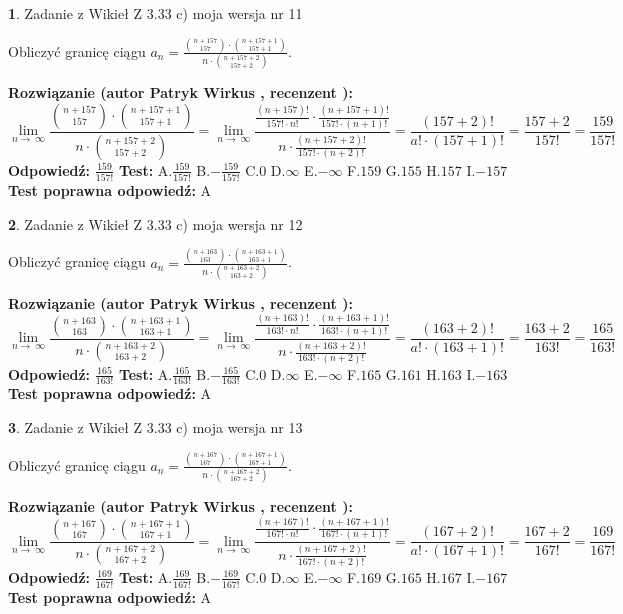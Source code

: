 \documentclass[12pt, a4paper]{article}
\theoremstyle{definition} %
\newtheorem{zad}{}
\newcommand{\zadStart}[1]{\begin{zad}#1\newline}
\newcommand{\zadStop}{\end{zad}}
\newcommand{\rozwStart}[2]{\noindent \textbf{Rozwiązanie (autor #1 , recenzent #2): }\newline}
\newcommand{\rozwStop}{\newline}
\newcommand{\odpStart}{\noindent \textbf{Odpowiedź:}\newline}
\newcommand{\odpStop}{\newline}
\newcommand{\testStart}{\noindent \textbf{Test:}\newline}
\newcommand{\testStop}{\newline}
\newcommand{\kluczStart}{\noindent \textbf{Test poprawna odpowiedź:}\newline}
\newcommand{\kluczStop}{\newline}
\begin{document}
\zadStart{Zadanie z Wikieł Z 3.33 c) moja wersja nr 11}

Obliczyć granicę ciągu $a_{n}=\frac{{n+157\choose157}\cdot{n+157+1\choose157+1}}{n\cdot{n+157+2\choose157+2}}$.
\zadStop
\rozwStart{Patryk Wirkus}{}
$$\lim\limits_{n\to\ \infty}\frac{{n+157\choose157}\cdot{n+157+1\choose157+1}}{n\cdot{n+157+2\choose157+2}} = \lim\limits_{n\to\ \infty}\frac{\frac{(n+157)!}{157! \cdot n!}\cdot \frac{(n+157+1)!}{157! \cdot (n+1)!}}{n\cdot \frac{(n+157+2)!}{157! \cdot (n+2)!}} = \frac{(157+2)!}{a!\cdot (157+1)!} = \frac{157+2}{157!} = \frac{159}{157!}$$
\rozwStop
\odpStart
$\frac{159}{157!}$
\odpStop
\testStart
A.$\frac{159}{157!}$ B.$-\frac{159}{157!}$ C.$0$ D.$\infty$ E.$-\infty$
F.$159$ G.$155$
H.$157$
I.$-157$
\testStop
\kluczStart
A
\kluczStop



\zadStart{Zadanie z Wikieł Z 3.33 c) moja wersja nr 12}

Obliczyć granicę ciągu $a_{n}=\frac{{n+163\choose163}\cdot{n+163+1\choose163+1}}{n\cdot{n+163+2\choose163+2}}$.
\zadStop
\rozwStart{Patryk Wirkus}{}
$$\lim\limits_{n\to\ \infty}\frac{{n+163\choose163}\cdot{n+163+1\choose163+1}}{n\cdot{n+163+2\choose163+2}} = \lim\limits_{n\to\ \infty}\frac{\frac{(n+163)!}{163! \cdot n!}\cdot \frac{(n+163+1)!}{163! \cdot (n+1)!}}{n\cdot \frac{(n+163+2)!}{163! \cdot (n+2)!}} = \frac{(163+2)!}{a!\cdot (163+1)!} = \frac{163+2}{163!} = \frac{165}{163!}$$
\rozwStop
\odpStart
$\frac{165}{163!}$
\odpStop
\testStart
A.$\frac{165}{163!}$ B.$-\frac{165}{163!}$ C.$0$ D.$\infty$ E.$-\infty$
F.$165$ G.$161$
H.$163$
I.$-163$
\testStop
\kluczStart
A
\kluczStop



\zadStart{Zadanie z Wikieł Z 3.33 c) moja wersja nr 13}

Obliczyć granicę ciągu $a_{n}=\frac{{n+167\choose167}\cdot{n+167+1\choose167+1}}{n\cdot{n+167+2\choose167+2}}$.
\zadStop
\rozwStart{Patryk Wirkus}{}
$$\lim\limits_{n\to\ \infty}\frac{{n+167\choose167}\cdot{n+167+1\choose167+1}}{n\cdot{n+167+2\choose167+2}} = \lim\limits_{n\to\ \infty}\frac{\frac{(n+167)!}{167! \cdot n!}\cdot \frac{(n+167+1)!}{167! \cdot (n+1)!}}{n\cdot \frac{(n+167+2)!}{167! \cdot (n+2)!}} = \frac{(167+2)!}{a!\cdot (167+1)!} = \frac{167+2}{167!} = \frac{169}{167!}$$
\rozwStop
\odpStart
$\frac{169}{167!}$
\odpStop
\testStart
A.$\frac{169}{167!}$ B.$-\frac{169}{167!}$ C.$0$ D.$\infty$ E.$-\infty$
F.$169$ G.$165$
H.$167$
I.$-167$
\testStop
\kluczStart
A
\kluczStop
\end{document}
